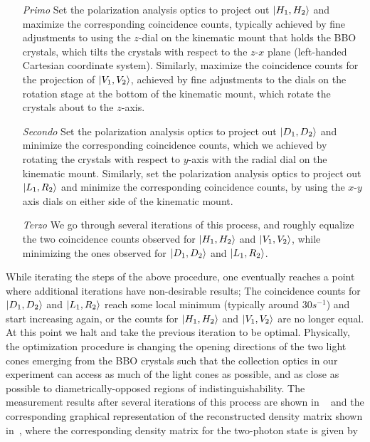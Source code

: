 \begin{itemize}
	\item[\emph{Primo}] Set the polarization analysis optics to project out $\ket{H_1,H_2}$ and maximize the corresponding coincidence counts, typically achieved by fine adjustments to using the $z$-dial on the kinematic mount that holds the \acs{BBO} crystals, which tilts the crystals with respect to the $z$-$x$ plane (left-handed Cartesian coordinate system). Similarly, maximize the coincidence counts for the projection of $\ket{V_1,V_2}$, achieved by fine adjustments to the dials on the rotation stage at the bottom of the kinematic mount, which rotate the crystals about to the $z$-axis. \item[\emph{Secondo}] Set the polarization analysis optics to project out $\ket{D_1,D_2}$ and minimize the corresponding coincidence counts, which we achieved by rotating the crystals with respect to $y$-axis with the radial dial on the kinematic mount. Similarly, set the polarization analysis optics to project out $\ket{L_1,R_2}$ and minimize the corresponding coincidence counts, by using the $x$-$y$ axis dials on either side of the kinematic mount.
	\item[\emph{Terzo}] We go through several iterations of this process, and roughly equalize the two coincidence counts observed for $\ket{H_1,H_2}$ and $\ket{V_1,V_2}$, while minimizing the ones observed for $\ket{D_1,D_2}$ and $\ket{L_1,R_2}$.
\end{itemize}

\noindent
While iterating the steps of the above procedure, one eventually reaches a point where additional iterations have non-desirable results; The coincidence counts for $\ket{D_1,D_2}$ and $\ket{L_1,R_2}$ reach some local minimum (typically around $30s^{-1}$) and start increasing again, or the counts for $\ket{H_1,H_2}$ and $\ket{V_1,V_2}$ are no longer equal. At this point we halt and take the previous iteration to be optimal. Physically, the optimization procedure is changing the opening directions of the two light cones emerging from the \acs{BBO} crystals such that the collection optics in our experiment can access as much of the light cones as possible, and as close as possible to diametrically-opposed regions of indistinguishability. The measurement results after several iterations of this process are shown in ~ and the corresponding graphical representation of the reconstructed density matrix shown in~, where the corresponding density matrix for the two-photon state is given by


